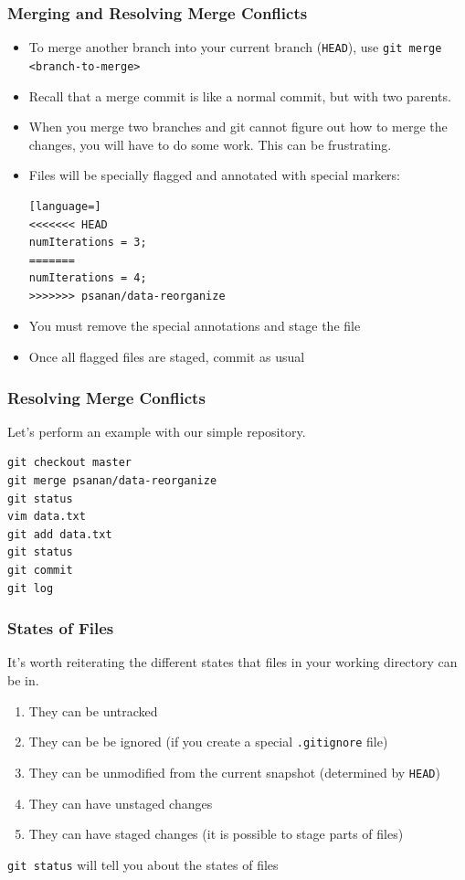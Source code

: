 \begin{frame}[fragile]
\frametitle{Merging and Resolving Merge Conflicts}
\begin{itemize}
\item To merge another branch into your current branch (\texttt{HEAD}), use \lstinline{git merge <branch-to-merge>}
\item Recall that a merge commit is like a normal commit, but with two parents.
\item When you merge two branches and git cannot figure out how to merge the changes, you will have to do some work. This can be frustrating.
\item Files will be specially flagged and annotated with special markers:
\begin{lstlisting}[language=]
<<<<<<< HEAD
numIterations = 3;
=======
numIterations = 4;
>>>>>>> psanan/data-reorganize
\end{lstlisting}
\item You must remove the special annotations and stage the file
\item Once all flagged files are staged, commit as usual
\end{itemize}
\end{frame}

\begin{frame}[fragile]
\frametitle{Resolving Merge Conflicts}
Let's perform an example with our simple repository.
\begin{lstlisting}
git checkout master
git merge psanan/data-reorganize
git status
vim data.txt
git add data.txt
git status
git commit
git log
\end{lstlisting}
\end{frame}

\begin{frame}[fragile]
\frametitle{States of Files}
It's worth reiterating the different states that files in your working directory can be in.
\begin{enumerate}
\item They can be untracked
\item They can be be ignored (if you create a special \texttt{.gitignore} file)
\item They can be unmodified from the current snapshot (determined by \texttt{HEAD})
\item They can have unstaged changes
\item They can have staged changes (it is possible to stage parts of files)
\end{enumerate}
\lstinline{git status} will tell you about the states of files
\end{frame}

